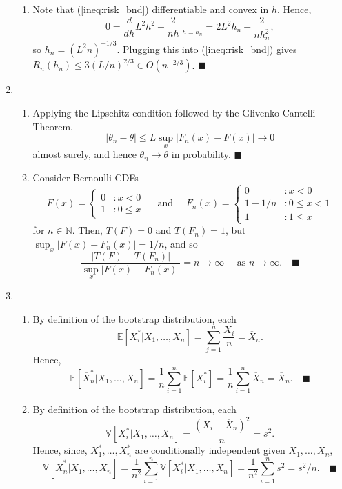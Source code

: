\documentclass[11pt]{article}
\renewcommand{\qed}{\quad \ensuremath{\blacksquare}}
\newcommand{\E}{\mathbb{E}} %
\newcommand{\Var}{\mathbb{V}} %
\newcommand{\N}{\mathbb{N}} %
\newcommand{\ol}{\overline}
\begin{document}
\begin{enumerate}
\begin{enumerate}
\item Note that (\ref{ineq:risk_bnd}) differentiable and convex in $h$. Hence,
\[0
    = \frac{d}{dh} L^2h^2 + \frac{2}{nh} \bigg|_{h = h_n}
    = 2L^2h_n - \frac{2}{nh_n^2},
\]
so $h_n = (L^2n)^{-1/3}$. Plugging this into (\ref{ineq:risk_bnd}) gives
$R_n(h_n) \leq 3(L/n)^{2/3} \in O(n^{-2/3})$. \qed
\end{enumerate}
\item
\begin{enumerate}
\item Applying the Lipschitz condition followed by the Glivenko-Cantelli
Theorem,
\[|\theta_n - \theta|
    \leq L\sup_x |F_n(x) - F(x)|
    \to 0
\]
almost surely, and hence $\theta_n \to \theta$ in probability. \qed
\item Consider Bernoulli CDFs
\[F(x) =
    \left\{
        \begin{array}{ll}
            0 & : x < 0 \\
            1 & : 0 \leq x
        \end{array}
    \right.
    \quad \mbox{ and } \quad
F_n(x) =
    \left\{
        \begin{array}{ll}
            0       & : x < 0           \\
            1 - 1/n & : 0 \leq x < 1    \\
            1       & : 1 \leq x
        \end{array}
    \right.
\]
for $n \in \N$. Then, $T(F) = 0$ and $T(F_n) = 1$, but
$\sup_x |F(x) - F_n(x)| = 1/n$, and so
\[\frac{|T(F) - T(F_n)|}{\sup_x |F(x) - F_n(x)|} = n \to \infty
    \quad \mbox{ as } n \to \infty. \qed
\]
\end{enumerate}
\item
\begin{enumerate}
\item By definition of the bootstrap distribution, each
\[\E[X_i^* | X_1,\dots,X_n] = \sum_{j = 1}^n \frac{X_i}{n} = \ol X_n.\]
Hence,
\[\E[\ol X_n^* | X_1,\dots,X_n]
    = \frac{1}{n} \sum_{i = 1}^n \E[X_i^*]
    = \frac{1}{n} \sum_{i = 1}^n \ol X_n
    = \ol X_n. \qed
\]

\item By definition of the bootstrap distribution, each
\[\Var[X_i^* | X_1,\dots,X_n]
    = \frac{(X_i - \ol X_n)^2}{n}
    = s^2.
\]
Hence, since, $X_1^*,\dots,X_n^*$ are conditionally independent given
$X_1,\dots,X_n$,
\[\Var[\ol X_n^* | X_1,\dots,X_n]
    = \frac{1}{n^2} \sum_{i = 1}^n \Var[X_i^* | X_1,\dots,X_n]
    = \frac{1}{n^2} \sum_{i = 1}^n s^2
    = s^2/n. \qed
\]
\end{enumerate}
\end{enumerate}
\end{document}

